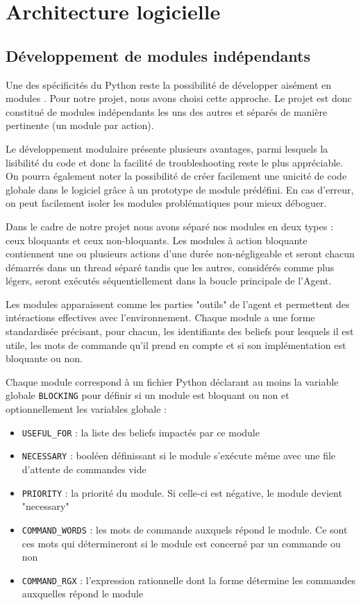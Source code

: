 \documentclass[11pt]{book}
\begin{document}
\chapter{Architecture logicielle}
\section{Développement de modules indépendants}
Une des spécificités du Python reste la possibilité de développer aisément
en modules \cite{gcumodular}. Pour notre projet, nous avons choisi cette 
approche. Le projet est donc constitué de modules indépendants les uns 
des autres et séparés de manière pertinente (un module par action). 

Le développement modulaire présente plusieurs avantages, parmi lesquels la 
lisibilité du code et donc la facilité de troubleshooting reste le plus 
appréciable. On pourra également noter la possibilité de créer facilement 
une unicité de code globale dans le logiciel grâce à un prototype de 
module prédéfini. En cas d’erreur, on peut facilement isoler les 
modules problématiques pour mieux déboguer.

Dans le cadre de notre projet nous avons séparé nos modules en deux types : 
ceux bloquants et ceux non-bloquants. Les modules à action bloquante 
contiennent une ou plusieurs actions d’une durée non-négligeable et seront 
chacun démarrés dans un thread séparé tandis que les autres, considérés 
comme plus légers, seront exécutés séquentiellement dans la boucle 
principale de l'Agent.

Les modules apparaissent comme les parties "outils" de l'agent et 
permettent des intéractions effectives avec l'environnement. Chaque module 
a une forme standardisée précisant, pour chacun, les identifiants des 
beliefs pour lesquels il est utile, les mots de commande qu'il prend en 
compte et si son implémentation est bloquante ou non.

Chaque module correspond à un fichier Python déclarant au moins la variable
globale \verb?BLOCKING? pour définir si un module est bloquant ou non et 
optionnellement les variables globale : 

\begin{itemize}
\item \verb?USEFUL_FOR? : la liste des beliefs impactés par ce module
\item \verb?NECESSARY? : booléen définissant si le module s'exécute même 
avec une file d'attente de commandes vide
\item \verb?PRIORITY? : la priorité du module. Si celle-ci est négative, le 
module devient "necessary"
\item \verb?COMMAND_WORDS? : les mots de commande auxquels répond le module. 
Ce sont ces mots qui détermineront si le module est concerné par un commande 
ou non
\item \verb?COMMAND_RGX? : l'expression rationnelle dont la forme détermine 
les commandes auxquelles répond le module
\end{itemize}
\end{document}
